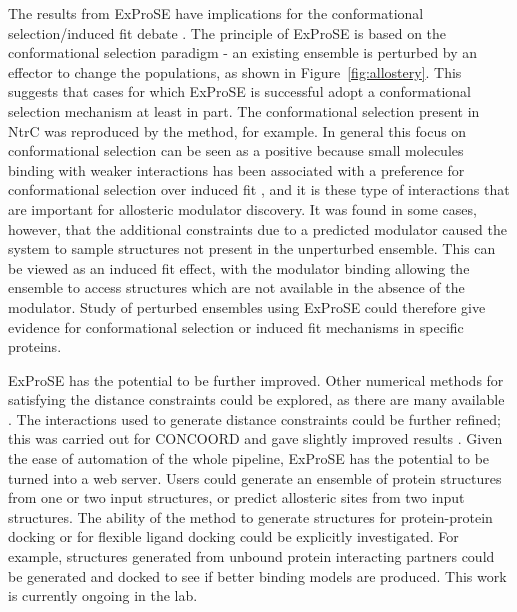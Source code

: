 The results from ExProSE have implications for the conformational selection/induced fit debate \cite{Boehr2009}.
The principle of ExProSE is based on the conformational selection paradigm - an existing ensemble is perturbed by an effector to change the populations, as shown in Figure~\ref{fig:allostery}.
This suggests that cases for which ExProSE is successful adopt a conformational selection mechanism at least in part.
The conformational selection present in NtrC was reproduced by the method, for example.
In general this focus on conformational selection can be seen as a positive because small molecules binding with weaker interactions has been associated with a preference for conformational selection over induced fit \cite{Okazaki2008}, and it is these type of interactions that are important for allosteric modulator discovery.
It was found in some cases, however, that the additional constraints due to a predicted modulator caused the system to sample structures not present in the unperturbed ensemble.
This can be viewed as an induced fit effect, with the modulator binding allowing the ensemble to access structures which are not available in the absence of the modulator.
Study of perturbed ensembles using ExProSE could therefore give evidence for conformational selection or induced fit mechanisms in specific proteins.

ExProSE has the potential to be further improved.
Other numerical methods for satisfying the distance constraints could be explored, as there are many available \cite{DeBakker2006}.
The interactions used to generate distance constraints could be further refined; this was carried out for CONCOORD and gave slightly improved results \cite{DeGroot1999}.
Given the ease of automation of the whole pipeline, ExProSE has the potential to be turned into a web server.
Users could generate an ensemble of protein structures from one or two input structures, or predict allosteric sites from two input structures.
The ability of the method to generate structures for protein-protein docking or for flexible ligand docking could be explicitly investigated.
For example, structures generated from unbound protein interacting partners could be generated and docked to see if better binding models are produced.
This work is currently ongoing in the lab.

